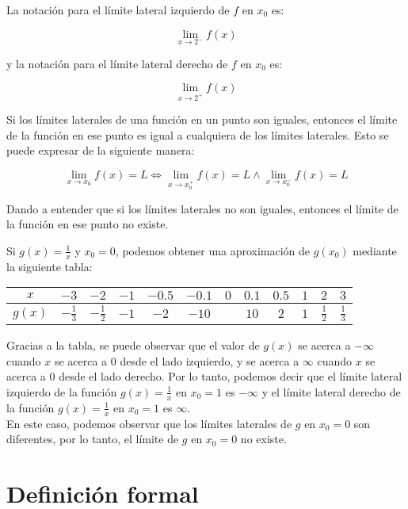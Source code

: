 La notación para el límite lateral izquierdo de $f$ en 
$x_0$ es: 

\[
    \lim_{x \to 2^-} f(x)
\]

y la notación para el límite lateral derecho de $f$ en 
$x_0$ es:

\[
    \lim_{x \to 2^+} f(x)
\]

Si los límites laterales de una función en un punto son 
iguales, entonces el límite de la función en ese punto es igual a 
cualquiera de los límites laterales. Esto se puede expresar de la 
siguiente manera:

\[
    \lim_{x \to x_0} f(x) = L \iff \lim_{x \to x_0^+} f(x) = L \wedge \lim_{x \to x_0^-} f(x) = L
\]

Dando a entender que si los límites laterales no son iguales, entonces
el límite de la función en ese punto no existe. \\ 

\ex{} {
    Si $g(x) = \frac{1}{x}$ y $x_0 = 0$, podemos 
    obtener una aproximación de $g(x_0)$ mediante la siguiente 
    tabla:

    \begin{center}
        \begin{tabular}{c|c|c|c|c|c|c|c|c|c|c|c}
            $x$ & $-3$ & $-2$ & $-1$ & $-0.5$ & $-0.1$ & $0$ & $0.1$ & $0.5$ & $1$ & $2$ & $3$ \\
            \hline
            $g(x)$ & $-\frac{1}{3}$ & $-\frac{1}{2}$ & $-1$ & $-2$ & $-10$ & & $10$ & $2$ & $1$ & $\frac{1}{2}$ & $\frac{1}{3}$ \\
        \end{tabular}
    \end{center}

    Gracias a la tabla, se puede observar que el valor de $g(x)$ 
    se acerca a $-\infty$ cuando $x$ se acerca a $0$ desde el 
    lado izquierdo, y se acerca a $\infty$ cuando $x$ se acerca a 
    $0$ desde el lado derecho. Por lo tanto, podemos decir que el
    límite lateral izquierdo de la función 
    $g(x) = \frac{1}{x}$ en $x_0 = 1$ es $-\infty$ y el límite lateral 
    derecho de la función $g(x) = \frac{1}{x}$ en $x_0 = 1$ es 
    $\infty$. \\

    En este caso, podemos observar que los límites laterales de 
    $g$ en $x_0 = 0$ son diferentes, por lo tanto, el límite de 
    $g$ en $x_0 = 0$ no existe.
}

\section{Definición formal}

